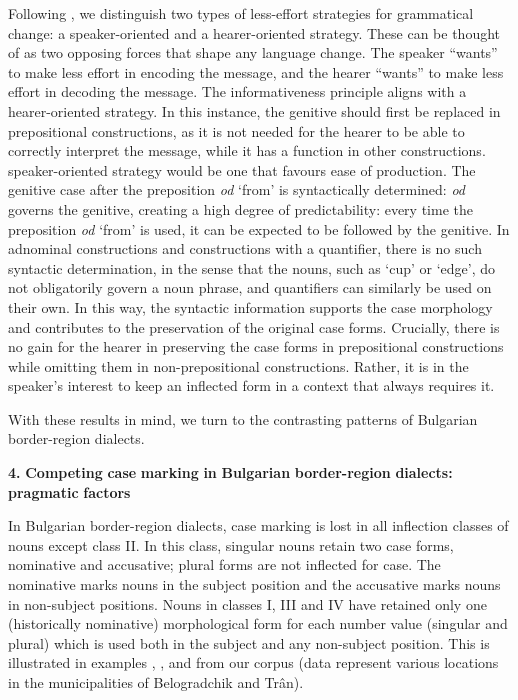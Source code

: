 \documentclass[output=paper]{langscibook}
\begin{document}
Following \citet{Norde2002}, we distinguish two types of less-effort strategies for grammatical change: a speaker-oriented and a hearer-oriented strategy. These can be thought of as two opposing forces that shape any language change. The speaker “wants” to make less effort in encoding the message, and the hearer “wants” to make less effort in decoding the message. The informativeness principle aligns with a hearer-oriented strategy. In this instance, the genitive should first be replaced in prepositional constructions, as it is not needed for the hearer to be able to correctly interpret the message, while it has a function in other constructions.  speaker-oriented strategy would be one that favours ease of production. The genitive case after the preposition \textit{od} ‘from’ is syntactically determined: \textit{od} governs the genitive, creating a high degree of predictability: every time the preposition \textit{od} ‘from’ is used, it can be expected to be followed by the genitive. In adnominal constructions and constructions with a quantifier, there is no such syntactic determination, in the sense that the nouns, such as ‘cup’ or ‘edge’, do not obligatorily govern a noun phrase, and quantifiers can similarly be used on their own. In this way, the syntactic information supports the case morphology and contributes to the preservation of the original case forms. Crucially, there is no gain for the hearer in preserving the case forms in prepositional constructions while omitting them in non-prepositional constructions. Rather, it is in the speaker’s interest to keep an inflected form in a context that always requires it.\textstyleFootnoteSymbol{} 

With these results in mind, we turn to the contrasting patterns of Bulgarian border-region dialects.

\textbf{4.} \textbf{Competing} \textbf{case} \textbf{marking} \textbf{in} \textbf{Bulgarian} \textbf{border-region} \textbf{dialects:} \textbf{pragmatic} \textbf{factors}

In Bulgarian border-region dialects, case marking is lost in all inflection classes of nouns except class II. In this class, singular nouns retain two case forms, nominative and accusative; plural forms are not inflected for case. The nominative marks nouns in the subject position and the accusative marks nouns in non-subject positions. Nouns in classes I, III and IV have retained only one (historically nominative) morphological form for each number value (singular and plural) which is used both in the subject and any non-subject position. This is illustrated in examples , ,  and  from our corpus (data represent various locations in the municipalities of Belogradchik and Trân). 
\end{document}
